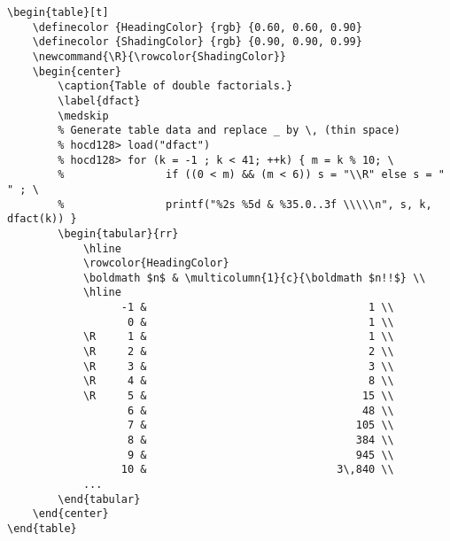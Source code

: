 \begin{Verbatim}[formatcom = \color{brown4}]
\begin{table}[t]
    \definecolor {HeadingColor} {rgb} {0.60, 0.60, 0.90}
    \definecolor {ShadingColor} {rgb} {0.90, 0.90, 0.99}
    \newcommand{\R}{\rowcolor{ShadingColor}}
    \begin{center}
        \caption{Table of double factorials.}
        \label{dfact}
        \medskip
        % Generate table data and replace _ by \, (thin space)
        % hocd128> load("dfact")
        % hocd128> for (k = -1 ; k < 41; ++k) { m = k % 10; \
        %                if ((0 < m) && (m < 6)) s = "\\R" else s = "  " ; \
        %                printf("%2s %5d & %35.0..3f \\\\\n", s, k, dfact(k)) }
        \begin{tabular}{rr}
            \hline
            \rowcolor{HeadingColor}
            \boldmath $n$ & \multicolumn{1}{c}{\boldmath $n!!$} \\
            \hline
                  -1 &                                   1 \\
                   0 &                                   1 \\
            \R     1 &                                   1 \\
            \R     2 &                                   2 \\
            \R     3 &                                   3 \\
            \R     4 &                                   8 \\
            \R     5 &                                  15 \\
                   6 &                                  48 \\
                   7 &                                 105 \\
                   8 &                                 384 \\
                   9 &                                 945 \\
                  10 &                              3\,840 \\
            ...
        \end{tabular}
    \end{center}
\end{table}
\end{Verbatim}

